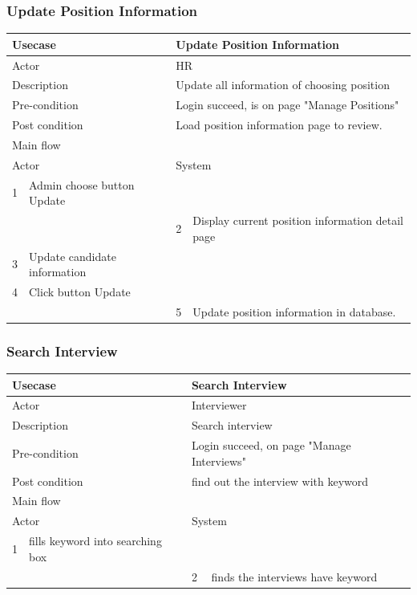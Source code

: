 \documentclass[a4paper]{article}
\begin{document}
\subsubsection{Update Position Information}
\begin{tabular}{|l|p{5cm}||l|p{5cm}|}
	\hline 
	\multicolumn{2}{|p{5cm}|}{Usecase} & \multicolumn{2}{|p{5cm}|}{Update Position Information}\\ 
	\hline 
	\multicolumn{2}{|p{5cm}|}{Actor} & \multicolumn{2}{|p{5cm}|}{HR} \\ 
	\hline 
	\multicolumn{2}{|p{5cm}|}{Description} & \multicolumn{2}{|p{5cm}|}{Update all information of choosing position}\\
	\hline
	\multicolumn{2}{|p{5cm}|}{Pre-condition} & \multicolumn{2}{|p{5cm}|}{Login succeed, is on page "Manage Positions"}\\
	\hline
	\multicolumn{2}{|p{5cm}|}{Post condition} & \multicolumn{2}{|p{5cm}|}{Load position information page to review.} \\
	\hline
	\multicolumn{4}{|l|}{Main flow} \\
	\hline
	\multicolumn{2}{|p{5cm}|}{Actor} & \multicolumn{2}{|p{5cm}|}{System} \\
	\hline
	1 & Admin choose button Update & & \\
	\hline
	& & 2 & Display current position information detail page \\
	\hline
	3 & Update candidate information & & \\
	\hline
	4 & Click button Update & & \\
	\hline	
	& & 5 &Update position information in database. \\	
	\hline 			
\end{tabular}
\subsubsection{Search Interview}
\begin{tabular}{|l|p{5cm}||l|p{5cm}|}
	\hline 
	\multicolumn{2}{|p{5cm}|}{Usecase} & \multicolumn{2}{|p{5cm}|}{Search Interview}\\ 
	\hline 
	\multicolumn{2}{|p{5cm}|}{Actor} & \multicolumn{2}{|p{5cm}|}{Interviewer} \\ 
	\hline 
	\multicolumn{2}{|p{5cm}|}{Description} & \multicolumn{2}{|p{5cm}|}{Search interview}\\
	\hline
	\multicolumn{2}{|p{5cm}|}{Pre-condition} & \multicolumn{2}{|p{5cm}|}{Login succeed, on page "Manage Interviews"}\\
	\hline
	\multicolumn{2}{|p{5cm}|}{Post condition} & \multicolumn{2}{|p{5cm}|}{find out the interview with keyword} \\
	\hline
	\multicolumn{4}{|l|}{Main flow} \\
	\hline
	\multicolumn{2}{|p{5cm}|}{Actor} & \multicolumn{2}{|p{5cm}|}{System} \\
	\hline
	1 & fills keyword into searching box & & \\
	\hline
	& & 2 & finds the interviews have keyword \\
	\hline 
\end{tabular}
\end{document}
